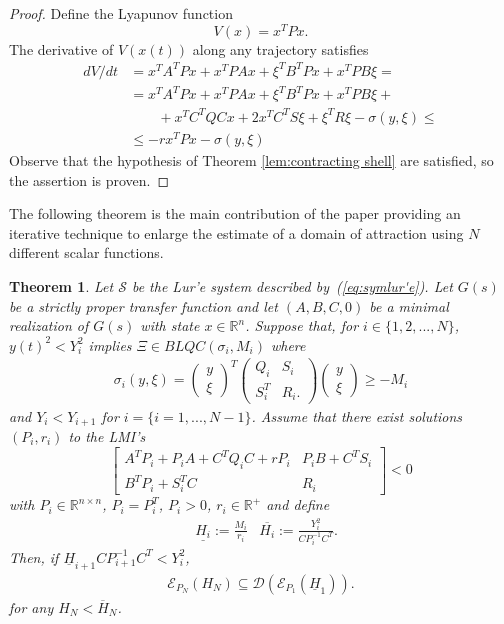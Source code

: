 \documentclass[letterpaper,10pt,twocolumn,journal,final]{IEEEtran}
\newtheorem{thm}{Theorem}[section]
\newcommand{\Real}{\mathbb{R}}
\newcommand{\ellips}{\mathcal{E}}
\begin{document}
\begin{proof}
	Define the Lyapunov function 
	\begin{equation}
		V(x)=x^TPx.
	\end{equation}
	The derivative of $V(x(t))$ along any trajectory satisfies
	\begin{align}
		dV/dt&=x^TA^TPx+x^TPAx+\xi^T B^T Px + x^T P B\xi=\\
			&=x^TA^TPx+x^TPAx+\xi^T B^T Px + x^T P B\xi+\\
			&\qquad +x^TC^TQCx+2x^TC^TS\xi+\xi^TR\xi-\sigma(y,\xi)\leq\\
			&\leq -r x^TPx -\sigma(y,\xi)
	\end{align}
	Observe that the hypothesis of Theorem \ref{lem:contracting shell} are satisfied, so the assertion is proven.
\end{proof}
The following theorem is the main contribution of the paper providing an iterative technique to enlarge the estimate of a domain of attraction using $N$ different scalar functions.
\begin{thm}\label{thm:nested ellipsoidal Lyap}
	Let $\mathcal{S}$ be the Lur'e system described by~(\ref{eq:symlur'e}). Let $G(s)$ be a strictly proper transfer function and let $(A,B,C,0)$ be a minimal realization of $G(s)$ with state $x \in \Real^{n}$.
	Suppose that, for $i\in\{1,2,...,N\}$, $y(t)^2<Y_i^2$ implies  $\Xi\in BLQC(\sigma_i,M_i)$ where
	\begin{align}
		\sigma_i(y,\xi)=
			\left(
				\begin{array}{c}
					y \\
					\xi
				\end{array}
			\right)^T
			\left(
				\begin{array}{cc}
					Q_i	& S_i \\
					S^T_i	& R_i.
				\end{array}
			\right)
			\left(
				\begin{array}{c}
					y \\
					\xi
				\end{array}
			\right)
			\geq -M_i
	\end{align}
	and $Y_i<Y_{i+1}$ for $i=\{i=1,...,N-1\}$.
	Assume that there exist solutions $(P_i, r_i)$ to the LMI's
	\begin{equation}
		\left[
			\begin{array}{cc}
				A^TP_i+P_iA+C^TQ_iC+rP_i	& P_iB+C^TS_i \\
				B^TP_i+S_i^TC			& R_i
			\end{array}
		\right] < 0
	\end{equation}
	with $P_i\in \Real^{n\times n}$, $P_i=P_i^T$, $P_i>0$, $r_i \in \Real^+$ and define
	\begin{align}
		& \underline{H_i} := \frac{M_i}{r_i}
		& \overline{H_i} := \frac{Y_i^2}{C P_i^{-1} C^T}.
	\end{align}
	Then, if $\underline{H}_{i+1} C P_{i+1}^{-1} C^T < Y_i^2$,
	\begin{align}
		\ellips_{P_N}(H_N)\subseteq \mathcal{D}(\ellips_{P_1}(\underline H_1)).
	\end{align}
	for any $H_N<\overline{H}_N$.
\end{thm}
\end{document}
